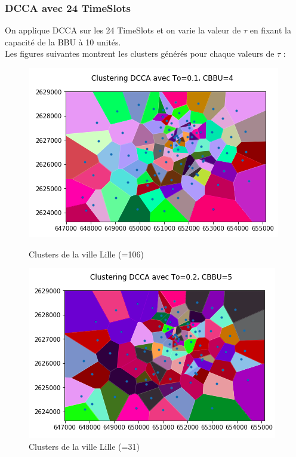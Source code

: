 \documentclass{report}
\begin{document}
\subsubsection{DCCA avec 24 TimeSlots}
On applique DCCA sur les 24 TimeSlots et on varie la valeur de $\tau$ en fixant la capacité de la BBU à 10 unités.\\
Les figures suivantes montrent les clusters générés pour chaque valeurs de $\tau$ :
\begin{figure}[H]
  \begin{minipage}{0.4\textwidth}
    \centering
    \includegraphics[scale=0.55]{images/To01.png}
    \caption{Clusters de la ville Lille (=106)}\label{Fig:Data1}
  \end{minipage}\hfill
  \begin{minipage}{0.4\textwidth}
    \centering
    \includegraphics[scale=0.55]{images/To02.png}
    \caption{Clusters de la ville Lille (=31)}\label{Fig:Data2}
  \end{minipage}
\end{figure} 
\end{document}
